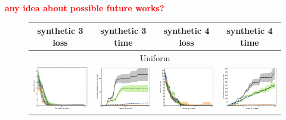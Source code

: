 \documentclass{article}
\renewcommand\[{\begin{equation}}
\renewcommand\]{\end{equation}}
\newcommand{\paolo}[1]{{\bf \textcolor{red}{{\fbox{Paolo:} #1}}}}
\begin{document}
\paolo{any idea about possible future works?}





\onecolumn

\begin{figure}[b]
    \centering
    {\footnotesize
    \begin{tabular}{cccc}
        \hline
        {\sc synthetic 3 loss} & {\sc synthetic 3 time} & {\sc synthetic 4 loss} & {\sc synthetic 4 time}
        \\
        \hline \hline
        \multicolumn{4}{c}{{\sc Uniform}}
        \\
        \includegraphics[width=10em]{figures/synthetic_vs_others_3_uniform_per_iter_loss} &
        \includegraphics[width=10em]{figures/synthetic_vs_others_3_uniform_per_iter_time} &
        \includegraphics[width=10em]{figures/synthetic_vs_others_4_uniform_per_iter_loss} &
        \includegraphics[width=10em]{figures/synthetic_vs_others_4_uniform_per_iter_time}

\end{tabular}}
\end{figure}
\end{document}

